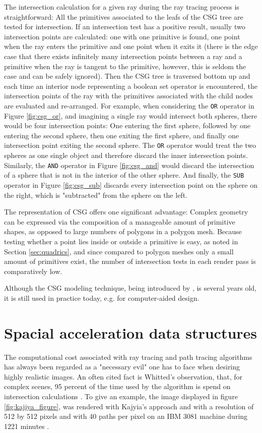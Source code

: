 The intersection calculation for a given ray during the ray tracing process is straightforward: 
All the primitives associated to the leafs of the CSG tree are tested for intersection. If an intersection test has a positive result, usually two intersection points are calculated: one  with one primitive is found, one point when the ray enters the primitive and one point when it exits it (there is the edge case that there exists infinitely many intersection points between a ray and a primitive when the ray is tangent to the primitive, however, this is seldom the case and can be safely ignored). Then the CSG tree is traversed bottom up and each time an interior node representing a boolean set operator is encountered, the intersection points of the ray with the primitives associated with the child nodes are evaluated and re-arranged. For example, when considering the \texttt{OR} operator in Figure \ref{fig:csg_or}, and imagining a single ray would intersect both spheres, there would be four intersection points: One entering the first sphere, followed by one entering the second sphere, then one exiting the first sphere, and finally one intersection point exiting the second sphere. The \texttt{OR} operator would treat the two spheres as one single object and therefore discard the inner intersection points. Similarly, the \texttt{AND} operator in Figure \ref{fig:csg_and} would discard the intersection of a sphere that is not in the interior of the other sphere. And finally, the \texttt{SUB} operator in Figure \ref{fig:csg_sub} discards every intersection point on the sphere on the right, which is "subtracted" from the sphere on the left.

The representation of CSG offers one significant advantage: Complex geometry can be expressed via the composition of a manageable amount of primitive shapes, as opposed to large numbers of polygons in a polygon mesh. Because testing whether a point lies inside or outside a primitive is easy, as noted in Section \ref{sec:quadrics}, and since compared to polygon meshes only a small amount of primitives exist, the number of intersection tests in each render pass is comparatively low.

Although the CSG modeling technique, being introduced by \cite{roth1982ray}, is several years old, it is still used in practice today, e.g. for computer-aided design.


\section{Spacial acceleration data structures} \label{sec:acceleration}
The computational cost associated with ray tracing and path tracing algorithms has always been regarded as a "necessary evil" one has to face when desiring highly realistic images. An often cited fact is Whitted's observation, that, for complex scenes, 95 percent of the time used by the algorithm is spend on intersection calculations \cite[p 349]{whitted1979improved}. To give an example, the image displayed in figure \ref{fig:kajiya_figure}, was rendered with Kajyia's approach  and with a resolution of 512 by 512 pixels and with 40 paths per pixel on an IBM 3081 machine during 1221 minutes \cite[p 149]{kajiya1986rendering}. 

